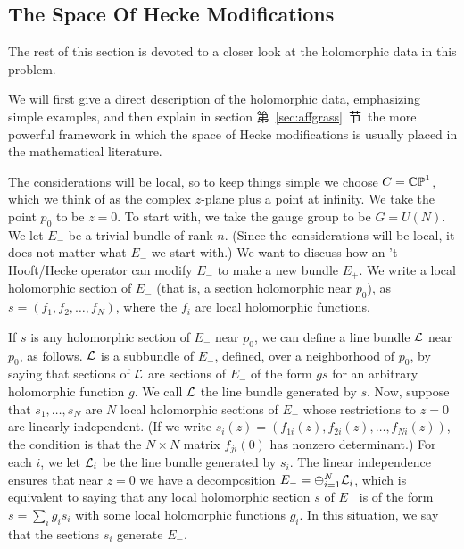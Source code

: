 
\subsection{The Space Of Hecke Modifications}

\label{sec:spaceheck}

The rest of this section is devoted to a closer look at the
holomorphic data in this problem.

We will first give a direct description of the holomorphic data,
emphasizing simple examples, and then explain in section
第~\ref{sec:affgrass}~节\ the more powerful framework in which the space of Hecke
modifications is usually placed in the mathematical literature.

The considerations will be local, so to keep things simple we
choose $C=\Bbb{CP}^1$, which we think of as the complex $z$-plane
plus a point at infinity.  We take the point $p_0$ to be $z=0$. To
start with, we take the gauge group to be $G=U(N)$.  We let $E_-$
be a trivial bundle of rank $n$. (Since the considerations will be
local, it does not matter what $E_-$ we start with.)  We want to
discuss how an 't Hooft/Hecke operator can modify $E_-$ to make a
new bundle $E_+$.
 We write a local holomorphic section of $E_-$
(that is, a section holomorphic near $p_0$), as
$s=(f_1,f_2,\dots,f_N)$, where the $f_i$ are local holomorphic
functions.

If $s$ is any holomorphic section of $E_-$ near $p_0$,  we can
define a line bundle ${\cal L}$ near $p_0$, as follows. ${\cal L}$
is a subbundle of $E_-$, defined, over a neighborhood of $p_0$, by
saying that sections of ${\cal L}$ are sections of $E_-$ of the
form $gs$ for an arbitrary holomorphic function $g$. We call
${\cal L}$ the line bundle generated by $s$. Now, suppose that
$s_1,\dots,s_N$ are $N$ local holomorphic sections of $E_-$ whose
restrictions to $z=0$ are linearly independent. (If we write
$s_i(z)=(f_{1i}(z),f_{2i}(z),\dots,f_{Ni}(z))$, the condition is
that the $N\times N$  matrix  $f_{ji}(0)$ has nonzero
determinant.) For each $i$, we let ${\cal L}_i$ be the line bundle
generated by $s_i$.  The linear independence ensures that near
$z=0$ we have a decomposition $E_-=\oplus_{i=1}^N{\cal L}_i$,
which is equivalent to saying that any local holomorphic section
$s$ of $E_-$ is of the form $s=\sum_i g_is_i$ with some local
holomorphic functions $g_i$.  In this situation, we say that the
sections $s_i$ generate $E_-$.

